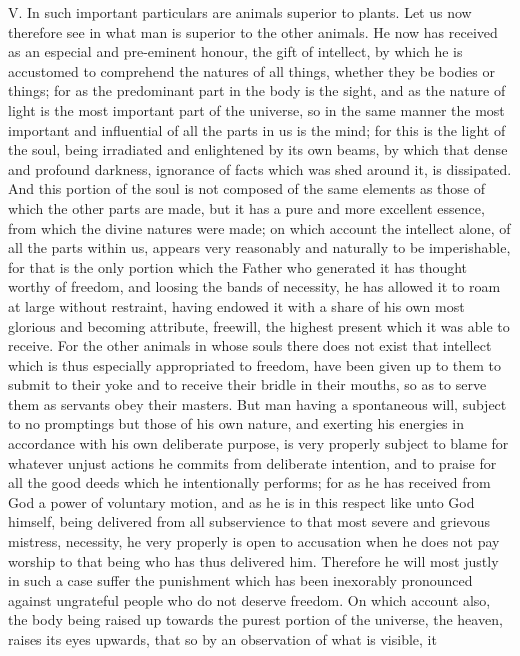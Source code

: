 V. In such important particulars are animals superior to plants. Let us now therefore see in what
man is superior to the other animals. He now has received as an especial and pre-eminent
honour, the gift of intellect, by which he is accustomed to comprehend the natures of all things,
whether they be bodies or things; for as the predominant part in the body is the sight, and as the
nature of light is the most important part of the universe, so in the same manner the most important
and influential of all the parts in us is the mind; for this is the light of the soul, being irradiated and
enlightened by its own beams, by which that dense and profound darkness, ignorance of facts
which was shed around it, is dissipated. And this portion of the soul is not composed of the same
elements as those of which the other parts are made, but it has a pure and more excellent
essence, from which the divine natures were made; on which account the intellect alone, of all the
parts within us, appears very reasonably and naturally to be imperishable, for that is the only
portion which the Father who generated it has thought worthy of freedom, and loosing the bands of
necessity, he has allowed it to roam at large without restraint, having endowed it with a share of his
own most glorious and becoming attribute, freewill, the highest present which it was able to receive.
For the other animals in whose souls there does not exist that intellect which is thus especially
appropriated to freedom, have been given up to them to submit to their yoke and to receive their
bridle in their mouths, so as to serve them as servants obey their masters. But man having a
spontaneous will, subject to no promptings but those of his own nature, and exerting his energies in
accordance with his own deliberate purpose, is very properly subject to blame for whatever unjust
actions he commits from deliberate intention, and to praise for all the good deeds which he
intentionally performs; for as he has received from God a power of voluntary motion, and as he is
in this respect like unto God himself, being delivered from all subservience to that most severe and
grievous mistress, necessity, he very properly is open to accusation when he does not pay
worship to that being who has thus delivered him. Therefore he will most justly in such a case
suffer the punishment which has been inexorably pronounced against ungrateful people who do not
deserve freedom. On which account also, the body being raised up towards the purest portion of
the universe, the heaven, raises its eyes upwards, that so by an observation of what is visible, it
